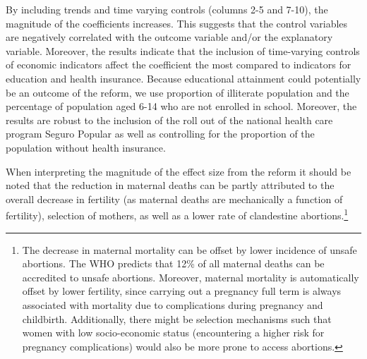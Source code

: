 \documentclass[a4paper, 11pt]{article}
\begin{document}
\begin{spacing}{2}
By including trends and time varying controls (columns 2-5 and 7-10), the magnitude of the coefficients increases. This suggests that the control variables are negatively correlated with the outcome variable and/or the explanatory variable. Moreover, the results indicate that the inclusion of time-varying controls of economic indicators affect the coefficient the most compared to indicators for education and health insurance. Because educational attainment could potentially be an outcome of the reform, we use proportion of illiterate population and the percentage of population aged 6-14 who are not enrolled in school. Moreover, the results are robust to the inclusion of the roll out of the national health care program Seguro Popular as well as controlling for the proportion of the population without health insurance. 

When interpreting the magnitude of the effect size from the reform it should be noted that the reduction in maternal deaths can be partly attributed to the overall decrease in fertility (as maternal deaths are mechanically a function of fertility), selection of mothers, as well as a lower rate of clandestine abortions.\footnote{The decrease in maternal mortality can be offset by lower incidence of unsafe abortions. The WHO predicts that 12\% of all maternal deaths can be accredited to unsafe abortions. Moreover, maternal mortality is automatically offset by lower fertility, since carrying out a pregnancy full term is always associated with mortality due to complications during pregnancy and childbirth. Additionally, there might be selection mechanisms such that women with low socio-economic status (encountering a higher risk for pregnancy complications) would also be more prone to access abortions.} 




\end{spacing}
\end{document}
